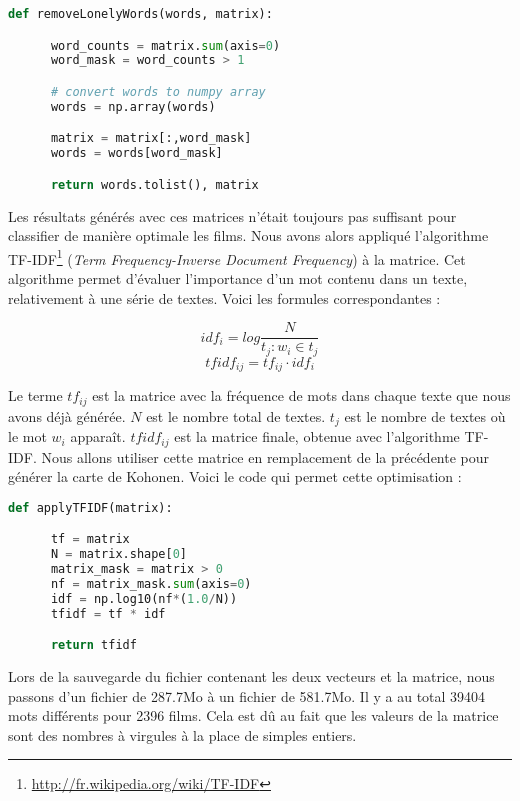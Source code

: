 \begin{lstlisting}[language=python]
  def removeLonelyWords(words, matrix):

      word_counts = matrix.sum(axis=0)
      word_mask = word_counts > 1

      # convert words to numpy array
      words = np.array(words)

      matrix = matrix[:,word_mask]
      words = words[word_mask]

      return words.tolist(), matrix
\end{lstlisting}

Les résultats générés avec ces matrices n'était toujours pas suffisant pour classifier de manière optimale les films. Nous avons alors appliqué l'algorithme TF-IDF\footnote{\url{http://fr.wikipedia.org/wiki/TF-IDF}} (\textit{Term Frequency-Inverse Document Frequency}) à la matrice. Cet algorithme permet d'évaluer l'importance d'un mot contenu dans un texte, relativement à une série de textes. Voici les formules correspondantes :

\[idf_i = log\frac{N}{t_j : w_i \in t_j}\]
\[tfidf_{ij} = tf_{ij} \cdot idf_i\]

Le terme $tf_{ij}$ est la matrice avec la fréquence de mots dans chaque texte que nous avons déjà générée. $N$ est le nombre total de textes. $t_j$ est le nombre de textes où le mot $w_i$ apparaît. $tfidf_{ij}$ est la matrice finale, obtenue avec l'algorithme TF-IDF. Nous allons utiliser cette matrice en remplacement de la précédente pour générer la carte de Kohonen. Voici le code qui permet cette optimisation : \\

\begin{lstlisting}[language=python] 
 def applyTFIDF(matrix):

      tf = matrix
      N = matrix.shape[0]
      matrix_mask = matrix > 0
      nf = matrix_mask.sum(axis=0)
      idf = np.log10(nf*(1.0/N))
      tfidf = tf * idf

      return tfidf
\end{lstlisting}

Lors de la sauvegarde du fichier contenant les deux vecteurs et la matrice, nous passons d'un fichier de 287.7Mo à un fichier de 581.7Mo. Il y a au total 39404 mots différents pour 2396 films. Cela est dû au fait que les valeurs de la matrice sont des nombres à virgules à la place de simples entiers.
\newpage
